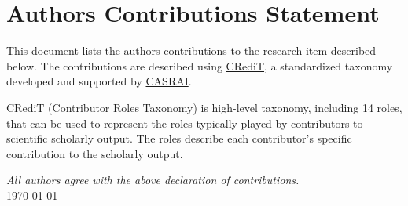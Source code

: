 \documentclass[a4paper]{article}
\newlength{\colauthlen}
\newlength{\minorskip}
\newlength{\majorskip}
\begin{document}

\section*{Authors Contributions Statement}
\thispagestyle{empty}

This document lists the authors contributions to the research item described below. 
The contributions are described using \href{https://www.casrai.org/credit.html}{CRediT}, a standardized taxonomy developed and supported by \href{https://www.casrai.org/}{CASRAI}.

CRediT (Contributor Roles Taxonomy) is high-level taxonomy, including 14 roles, that can be used to represent the roles typically played by contributors to scientific scholarly output. The roles describe each contributor’s specific contribution to the scholarly output.

\vspace{\majorskip}



\vspace{\majorskip}



\vspace{\majorskip}

\textit{All authors agree with the above declaration of contributions.} \\[0.3\minorskip]
\today

\end{document}

